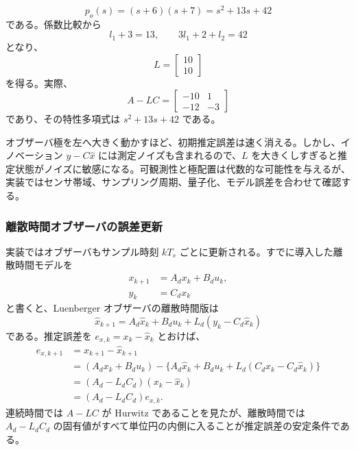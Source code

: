 \begin{equation}
  p_o(s)=(s+6)(s+7)=s^2+13s+42
\end{equation}
である。係数比較から
\begin{equation}
  l_1+3=13,\qquad 3l_1+2+l_2=42
\end{equation}
となり、
\begin{equation}
  L=\begin{bmatrix}10\\10\end{bmatrix}
\end{equation}
を得る。実際、
\begin{equation}
  A-LC=\begin{bmatrix}-10&1\\-12&-3\end{bmatrix}
\end{equation}
であり、その特性多項式は $s^2+13s+42$ である。

オブザーバ極を左へ大きく動かすほど、初期推定誤差は速く消える。しかし、イノベーション $y-C\hat{x}$ には測定ノイズも含まれるので、$L$ を大きくしすぎると推定状態がノイズに敏感になる。可観測性と極配置は代数的な可能性を与えるが、実装ではセンサ帯域、サンプリング周期、量子化、モデル誤差を合わせて確認する。

\subsubsection{離散時間オブザーバの誤差更新}

実装ではオブザーバもサンプル時刻 $kT_s$ ごとに更新される。すでに導入した離散時間モデルを
\begin{align}
  x_{k+1}&=A_d x_k+B_d u_k,\\
  y_k&=C_d x_k
\end{align}
と書くと、Luenberger オブザーバの離散時間版は
\begin{equation}
  \hat{x}_{k+1}=A_d\hat{x}_k+B_d u_k+L_d(y_k-C_d\hat{x}_k)
\end{equation}
である。推定誤差を $e_{x,k}=x_k-\hat{x}_k$ とおけば、
\begin{align}
  e_{x,k+1}
  &=x_{k+1}-\hat{x}_{k+1}\\
  &=(A_d x_k+B_d u_k)
    -\{A_d\hat{x}_k+B_d u_k+L_d(C_d x_k-C_d\hat{x}_k)\}\\
  &=(A_d-L_d C_d)(x_k-\hat{x}_k)\\
  &=(A_d-L_d C_d)e_{x,k}.
\end{align}
連続時間では $A-LC$ が Hurwitz であることを見たが、離散時間では
$A_d-L_d C_d$ の固有値がすべて単位円の内側に入ることが推定誤差の安定条件である。

